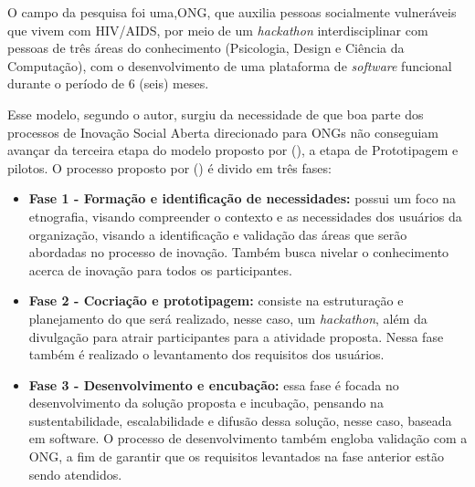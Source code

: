 O campo da pesquisa foi uma,\gls{ONG}, que  auxilia  pessoas socialmente vulneráveis  que  vivem  com  HIV/AIDS, por meio de um \textit{hackathon} interdisciplinar com pessoas de três áreas do conhecimento (Psicologia, Design e Ciência da Computação), com o desenvolvimento de uma plataforma de \textit{software} funcional durante o período de 6 (seis) meses.

Esse modelo, segundo o autor, surgiu da necessidade de que boa parte dos processos de Inovação Social Aberta direcionado para \gls{ONG}s não conseguiam avançar da terceira etapa do modelo proposto por \citeauthor{murray2010} (\citeyear{murray2010}), a etapa de Prototipagem e pilotos. O processo proposto por \citeauthor{gama2023} (\citeyear{gama2023}) é divido em três fases:



\begin{itemize}
    \item \textbf{Fase 1 - Formação e identificação de necessidades:} possui um foco na etnografia, visando compreender o contexto e as necessidades dos usuários da organização, visando a identificação e validação das áreas que serão abordadas no processo de inovação. Também busca nivelar o conhecimento acerca de inovação para todos os participantes.
    \item \textbf{Fase 2 - Cocriação e prototipagem:} consiste na estruturação e planejamento do que será realizado, nesse caso, um \textit{hackathon}, além da divulgação para atrair participantes para a atividade proposta. Nessa fase também é realizado o levantamento dos requisitos dos usuários.
    \item \textbf{Fase 3 - Desenvolvimento e encubação:} essa fase é focada no desenvolvimento da solução proposta e incubação, pensando na sustentabilidade, escalabilidade e difusão dessa solução, nesse caso, baseada em software. O processo de desenvolvimento também engloba validação com a ONG, a fim de garantir que os requisitos levantados na fase anterior estão sendo atendidos.
\end{itemize}

